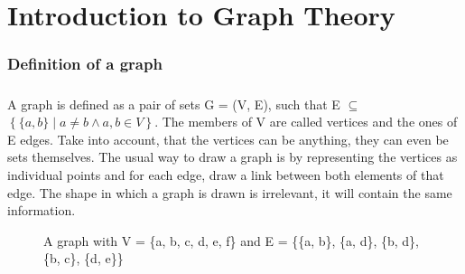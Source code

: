 \chapter{Introduction to Graph Theory}

\subsection{Definition of a graph}
\paragraph{}
A graph is defined as a pair of sets G = (V, E), such that E $\subseteq$ $\left\{\{a, b\} \mid a \neq b \wedge a,b \in V\right\}$. The members of V are called vertices and the ones of E edges. Take into account, that the vertices can be anything, they can even be sets themselves. The usual way to draw a graph is by representing the vertices as individual points and for each edge, draw a link between both elements of that edge. The shape in which a graph is drawn is irrelevant, it will contain the same information.

\begin{figure}[h]

\caption{A graph with V = \{a, b, c, d, e, f\} and E = \{\{a, b\}, \{a, d\}, \{b, d\}, \{b, c\}, \{d, e\}\}}
\end{figure}

